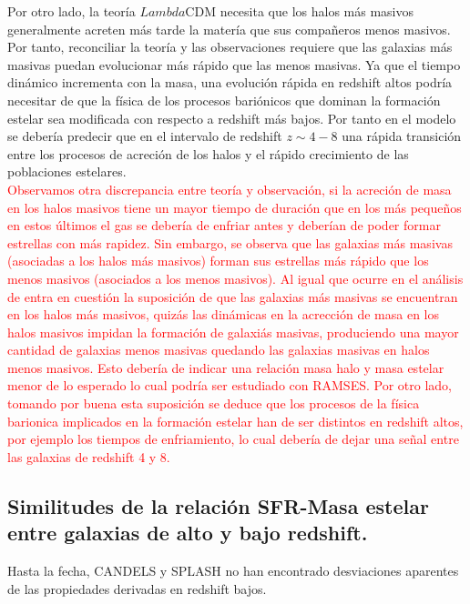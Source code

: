 \documentclass{article}
\begin{document}
Por otro lado, la teoría $Lambda$CDM necesita que los halos más masivos generalmente acreten más tarde la matería que sus compañeros menos masivos. Por tanto, reconciliar la teoría y las observaciones requiere que las galaxias más masivas puedan evolucionar más rápido que las menos masivas. Ya que el tiempo dinámico incrementa con la masa, una evolución rápida en redshift altos podría necesitar de que la física de los procesos bariónicos que dominan la formación estelar sea modificada con respecto a redshift más bajos. Por tanto en el modelo se debería predecir que en el intervalo de redshift $z\sim 4-8$ una rápida transición entre los procesos de acreción de los halos y el rápido crecimiento de las poblaciones estelares. \\

\textcolor{red}{Observamos otra discrepancia entre teoría y observación, si la acreción de masa en los halos masivos tiene un mayor tiempo de duración que en los más pequeños en estos últimos el gas se debería de enfriar antes y deberían de poder formar estrellas con más rapidez. Sin embargo, se observa que las galaxias más masivas (asociadas a los halos más masivos) forman sus estrellas más rápido que los menos masivos (asociados a los menos masivos). Al igual que ocurre en el análisis de \cite{finkelstein2015evolution} \citep{arranz2015finkelstein} entra en cuestión la suposición de que las galaxias más masivas se encuentran en los halos más masivos, quizás las dinámicas en la acrección de masa en los halos masivos impidan la formación de galaxiás masivas, produciendo una mayor cantidad de galaxias menos masivas quedando las galaxias masivas en halos menos masivos. Esto debería de indicar una relación masa halo y masa estelar menor de lo esperado lo cual podría ser estudiado con RAMSES. Por otro lado, tomando por buena esta suposición se deduce que los procesos de la física barionica implicados en la formación estelar han de ser distintos en redshift altos, por ejemplo los tiempos de enfriamiento, lo cual debería de dejar una señal entre las galaxias de redshift 4 y 8.}\\

\subsection*{Similitudes de la relación SFR-Masa estelar entre galaxias de alto y bajo redshift.}

Hasta la fecha, CANDELS y SPLASH no han encontrado desviaciones aparentes de las propiedades derivadas en redshift bajos. 

\newpage



\newpage
\appendix

\end{document}
